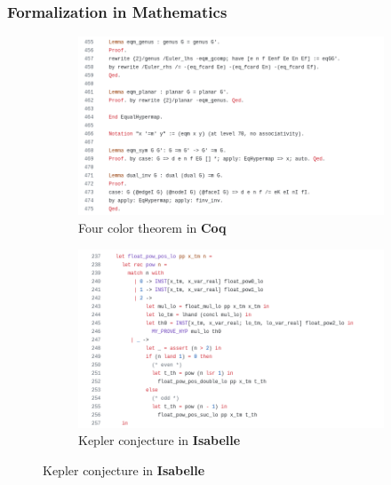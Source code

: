 \documentclass{beamer}
\theoremstyle{definition}
\theoremstyle{remark}
\begin{document}
\begin{frame}
	\frametitle{Formalization in Mathematics}
 \begin{figure}
		\centering
		\begin{subfigure}[b]{0.45\textwidth}
						\includegraphics[width=\textwidth]{fourcolor.png}
						\caption{\tiny Four color theorem in \textbf{Coq}}
		\end{subfigure}
		\hspace{0.5cm}
		\begin{subfigure}[b]{0.45\textwidth}
						\includegraphics[width=\textwidth]{kepler.png}
						\caption{\tiny Kepler conjecture in \textbf{Isabelle}}
		\end{subfigure}


\end{figure}
\end{frame}
\end{document}
